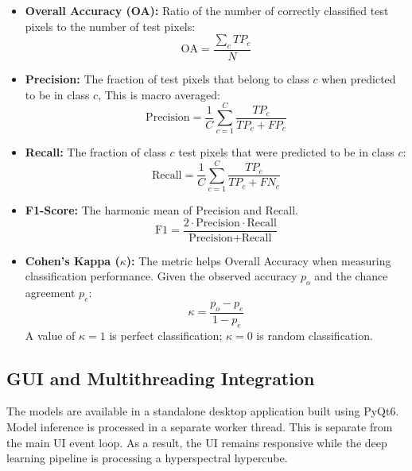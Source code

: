 \begin{itemize}
    \item \textbf{Overall Accuracy (OA):} Ratio of the number of correctly classified test pixels to the number of test pixels:
    \begin{equation}
        \text{OA} = \frac{\sum_{c} TP_c}{N}
    \end{equation}

    \item \textbf{Precision:} The fraction of test pixels that belong to class $c$ when predicted to be in class $c$, This is macro averaged:
    \begin{equation}
        \text{Precision} = \frac{1}{C} \sum_{c=1}^{C} \frac{TP_c}{TP_c + FP_c}
    \end{equation}

    \item \textbf{Recall:}  The fraction of class $c$ test pixels that were predicted to be in class $c$:
    \begin{equation}
        \text{Recall} = \frac{1}{C} \sum_{c=1}^{C} \frac{TP_c}{TP_c + FN_c}
    \end{equation}

    \item \textbf{F1-Score:} The harmonic mean of Precision and Recall.
    \begin{equation}
        \text{F1} = \frac{2 \cdot \text{Precision} \cdot \text{Recall}}{\text{Precision} + \text{Recall}}
    \end{equation}

    \item \textbf{Cohen's Kappa ($\kappa$):} The metric helps Overall Accuracy when measuring classification performance. Given the observed accuracy $p_o$ and the chance agreement $p_e$:
    \begin{equation}
        \kappa = \frac{p_o - p_e}{1 - p_e}
    \end{equation}
    A value of $\kappa = 1$ is perfect classification; $\kappa = 0$ is random classification.
\end{itemize}

\subsection{GUI and Multithreading Integration}
The models are available in a standalone desktop application built using PyQt6. Model inference is processed in a separate worker thread. This is separate from the main UI event loop. As a result, the UI remains responsive while the deep learning pipeline is processing a hyperspectral hypercube.